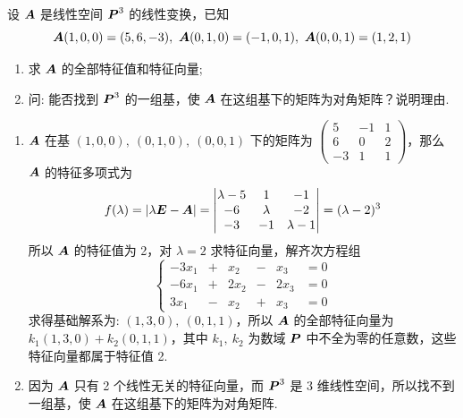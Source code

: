 \begin{example}
    设 $\vb*{A}$ 是线性空间 $\vb*{P}^3$ 的线性变换，已知
    $$\vb*{A}(1,0,0)=(5,6,-3),~\vb*{A}(0,1,0)=(-1,0,1),~\vb*{A}(0,0,1)=(1,2,1)$$
    \begin{enumerate}[label=(\arabic{*})]
        \item 求 $\vb*{A}$ 的全部特征值和特征向量;
        \item 问: 能否找到 $\vb*{P}^3$ 的一组基，使 $\vb*{A}$ 在这组基下的矩阵为对角矩阵？说明理由.
    \end{enumerate}
\end{example}
\begin{solution}
    \begin{enumerate}[label=(\arabic{*})]
        \item $\vb*{A}$ 在基 $(1,0,0),~(0,1,0),~(0,0,1)$ 下的矩阵为
              $\begin{pmatrix}
                      5  & -1 & 1 \\
                      6  & 0  & 2 \\
                      -3 & 1  & 1
                  \end{pmatrix}$，那么 $\vb*{A}$ 的特征多项式为
              $$f(\lambda)=|\lambda\vb*{E}-\vb*{A}|=\begin{vmatrix}
                      \lambda -5 & 1       & -1         \\
                      -6         & \lambda & -2         \\
                      -3         & -1      & \lambda -1
                  \end{vmatrix}\xlongequal[]{}(\lambda-2)^3$$
              所以 $\vb*{A}$ 的特征值为 2，对 $\lambda=2$ 求特征向量，解齐次方程组
              $$\left\{\begin{matrix}
                      -3x_1 & + & x_2  & - & x_3  & =0 \\
                      -6x_1 & + & 2x_2 & - & 2x_3 & =0 \\
                      3x_1  & - & x_2  & + & x_3  & =0
                  \end{matrix}\right.$$
              求得基础解系为: $(1,3,0),~(0,1,1)$，所以 $\vb*{A}$ 的全部特征向量为 $k_1(1,3,0)+k_2(0,1,1)$，其中 $k_1,~k_2$ 为数域 $\vb*{P}$
              中不全为零的任意数，这些特征向量都属于特征值 2.
        \item 因为 $\vb*{A}$ 只有 2 个线性无关的特征向量，而 $\vb*{P}^3$ 是 3 维线性空间，所以找不到一组基，使 $\vb*{A}$ 在这组基下的矩阵为对角矩阵.
    \end{enumerate}
\end{solution}

